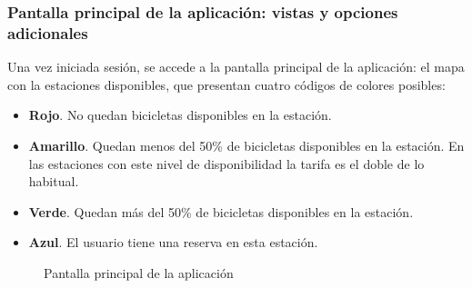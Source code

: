 \FloatBarrier
\subsubsection{Pantalla principal de la aplicación: vistas y opciones adicionales}

Una vez iniciada sesión, se accede a la pantalla principal de la aplicación: el mapa con la estaciones disponibles, que presentan cuatro códigos de colores posibles:

\begin{itemize}
	\item \textbf{\color{red} Rojo}. No quedan bicicletas disponibles en la estación.
	\item \textbf{\color{yellow} Amarillo}. Quedan menos del 50\% de bicicletas disponibles en la estación. En las estaciones con este nivel de disponibilidad la tarifa es el doble de lo habitual.
	\item \textbf{\color{green} Verde}. Quedan más del 50\% de bicicletas disponibles en la estación.
	\item \textbf{\color{blue} Azul}. El usuario tiene una reserva en esta estación.
\end{itemize}

\begin{figure} [!htb]
	\centering
	\caption{Pantalla principal de la aplicación}
	\label{fig:pantallaPrincipal}
\end{figure}

